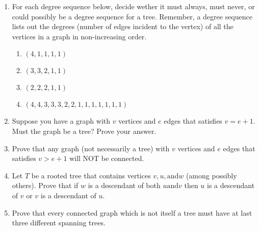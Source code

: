 \documentclass[11pt, letterpaper, includehead]{article}
\theoremstyle{plain}
\theoremstyle{mydefinition}
\theoremstyle{myproperty}
\begin{document}
\begin{enumerate}[label=\textbf{\arabic*}., leftmargin=*]
    \item For each degree sequence below, decide wether it must always, must never, or could possibly be a degree sequence for a tree. Remember, a degree sequence lists out the degrees (number of edges incident to the vertex) of all the vertices in a graph in non-increasing order.
    \begin{enumerate}[label=(\alph*)]
        \item $(4, 1, 1, 1, 1)$
        \item $(3, 3, 2, 1, 1)$
        \item $(2, 2, 2, 1, 1)$
        \item $(4, 4, 3, 3, 3, 2, 2, 1, 1, 1, 1, 1, 1, 1)$
    \end{enumerate}

    \item Suppose you have a graph with $v$ vertices and $e$ edges that satisfies $v = e + 1$. Must the graph be a tree? Prove your answer.
    \item Prove that any graph (not necessarily a tree) with $v$ vertices and $e$ edges that satisfies $v > e + 1$ will NOT be connected.
    \item Let $T$ be a rooted tree that contains vertices $v, u, \text{and} w$ (among possibly others). Prove that if $w$ is a descendant of both $u \text{and} v$ then $u$ is a descendant of $v$ or $v$ is a descendant of $u$.
    \item Prove that every connected graph which is not itself a tree must have at last three different spanning trees.
\end{enumerate}
\end{document}
